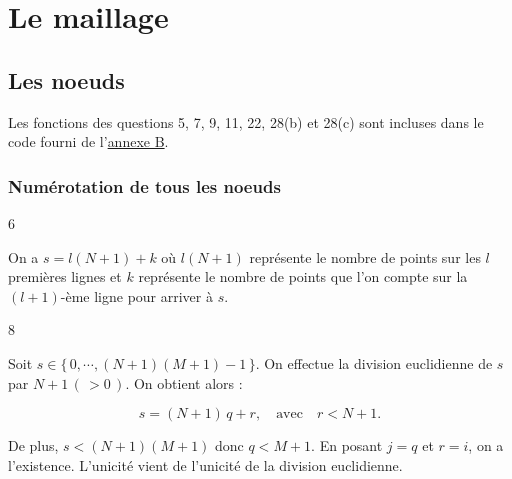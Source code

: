 \section{Le maillage}

\subsection{Les noeuds}

\begin{remark*}
    
    Les fonctions des questions 5, 7, 9, 11, 22, 28(b) et 28(c) sont incluses dans le code fourni de l'\hyperref[sec:fonctions]{annexe B}.
    
\end{remark*}

\subsubsection{Numérotation de tous les noeuds}

\begin{reponse}{6}

\begin{center}
\end{center}

On a $s = l(N+1)+k$ où $l(N+1)$ représente le nombre de points sur les $l$ premières lignes et $k$ représente le nombre de points que l'on compte sur la $(l+1)$-ème ligne pour arriver à $s$.
\end{reponse}


\begin{reponse}{8}

Soit $s \in \{ \, 0, \cdots, (N+1)(M+1)-1 \, \}$. On effectue la division euclidienne de $s$ par $N+1 \, ( \, >0 \, )$. On obtient alors :

\[
    s = (N+1) \, q + r, \quad \text{avec} \quad r < N+1.
\]

De plus, $s < (N+1)(M+1)$ donc $q < M+1$. En posant $j=q$ et $r=i$, on a l'existence. L'unicité vient de l'unicité de la division euclidienne.     
\end{reponse}

